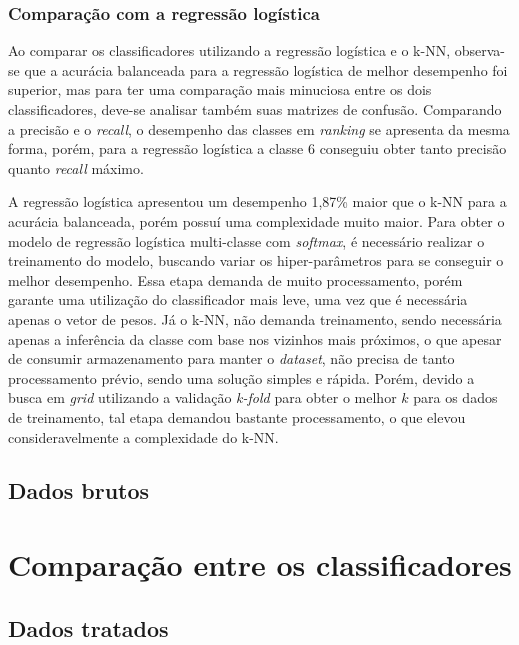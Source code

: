 \subsubsection*{Comparação com a regressão logística}

Ao comparar os classificadores utilizando a regressão logística e o k-NN, observa-se que a acurácia balanceada para a regressão logística de melhor desempenho foi superior, mas para ter uma comparação mais minuciosa entre os dois classificadores, deve-se analisar também suas matrizes de confusão. Comparando a precisão e o \textit{recall}, o desempenho das classes em \textit{ranking} se apresenta da mesma forma, porém, para a regressão logística a classe 6 conseguiu obter tanto precisão quanto \textit{recall} máximo.

A regressão logística apresentou um desempenho 1,87\% maior que o k-NN para a acurácia balanceada, porém possuí uma complexidade muito maior. Para obter o modelo de regressão logística multi-classe com \textit{softmax}, é necessário realizar o treinamento do modelo, buscando variar os hiper-parâmetros para se conseguir o melhor desempenho. Essa etapa demanda de muito processamento, porém garante uma utilização do classificador mais leve, uma vez que é necessária apenas o vetor de pesos. Já o k-NN, não demanda treinamento, sendo necessária apenas a inferência da classe com base nos vizinhos mais próximos, o que apesar de consumir armazenamento para manter o \textit{dataset}, não precisa de tanto processamento prévio, sendo uma solução simples e rápida. Porém, devido a busca em \textit{grid} utilizando a validação \textit{k-fold} para obter o melhor $k$ para os dados de treinamento, tal etapa demandou bastante processamento, o que elevou consideravelmente a complexidade do k-NN.


\subsection{Dados brutos}







\section{Comparação entre os classificadores}

\subsection{Dados tratados}


